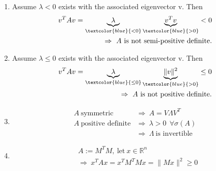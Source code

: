 {\color{solution}
\begin{enumerate}
	\item Assume $\lambda<0$ exists with the associated eigenvector v. Then
	\begin{align*}
	v^TAv=\underbrace{\lambda}_{\textcolor{blue}{<0}}\underbrace{v^Tv}_{\textcolor{blue}{>0}}<0\\
	\Rightarrow~A~\text{is not semi-positive definite}.
	\end{align*}
	\item 
	Assume $\lambda\leq0$ exists with the associated eigenvector v. Then
	\begin{align*}
	v^TAv=\underbrace{\lambda}_{\textcolor{blue}{\leq0}}\underbrace{\|v\|^2}_{\textcolor{blue}{>0}}\leq0\\
	\Rightarrow~A~\text{is not positive definite}.
	\end{align*}
	\item 
	\begin{align*}
	A~\text{symmetric} & \Rightarrow~A=V\Lambda V^T\\
	A~ \text{positive definite}&\Rightarrow~\lambda>0~~\forall\sigma(A)\\ 
	&\Rightarrow~\Lambda ~\text{is invertible}
	\end{align*}
	\item 
	\begin{align*}
	&A:=M^TM,~\text{let}~x\in\mathbb{R}^n\\ 
	&\Rightarrow~x^TAx=x^TM^TMx=\|Mx\|^2\geq 0
	\end{align*}
\end{enumerate}
}